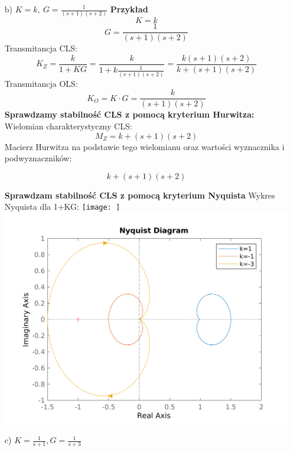 \documentclass{article}
\begin{document}
\begin{itemize}
    \item[b)] $K=k, \ G=\frac{1}{\left(s + 1\right) \left(s + 2\right)}$
    \textbf{Przykład }
$$K=k$$
$$G=\frac{1}{\left(s + 1\right) \left(s + 2\right)}$$
Transmitancja CLS:
$$K_Z=\frac{k}{1+KG}=\frac{k}{1+k\frac{1}{\left(s + 1\right) \left(s + 2\right)}}=\frac{k \left(s + 1\right) \left(s + 2\right)}{k + \left(s + 1\right) \left(s + 2\right)}$$
Transmitancja OLS:
$$K_O=K\cdot G=\frac{k}{\left(s + 1\right) \left(s + 2\right)}$$
\textbf{Sprawdzamy stabilność CLS z pomocą kryterium Hurwitza:}\newline
Wielomian charakterystyczny CLS:
$$M_Z=k + \left(s + 1\right) \left(s + 2\right)$$
Macierz Hurwitza na podstawie tego wielomianu oraz wartości wyznacznika i podwyznaczników:

$$k + \left(s + 1\right) \left(s + 2\right)$$

\newline\textbf{Sprawdzam stabilność CLS z pomocą kryterium Nyquista}\newline
Wykres Nyquista dla 1+KG:
\texttt{[image: ]}
\newpage
        \includegraphics[scale=0.8]{b.png}
        \newpage            
    
    \item[c)] $K=\frac{1}{s + 1}, G=\frac{1}{s + 3}$
    

\end{itemize}
\end{document}
